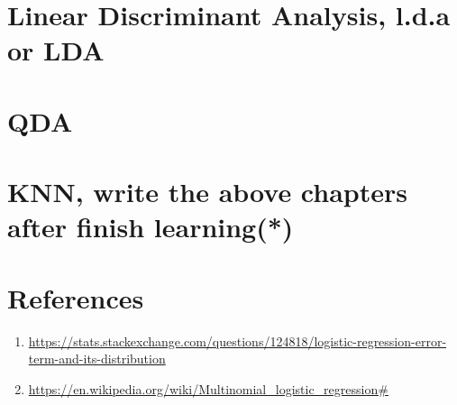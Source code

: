 \section{Linear  Discriminant Analysis, l.d.a or LDA}
\section{QDA}
\section{KNN, write the above chapters after finish learning(*)}
\section{References}
\begin{enumerate}
    \item \url{https://stats.stackexchange.com/questions/124818/logistic-regression-error-term-and-its-distribution}
    \item \url{https://en.wikipedia.org/wiki/Multinomial_logistic_regression#}
\end{enumerate}


